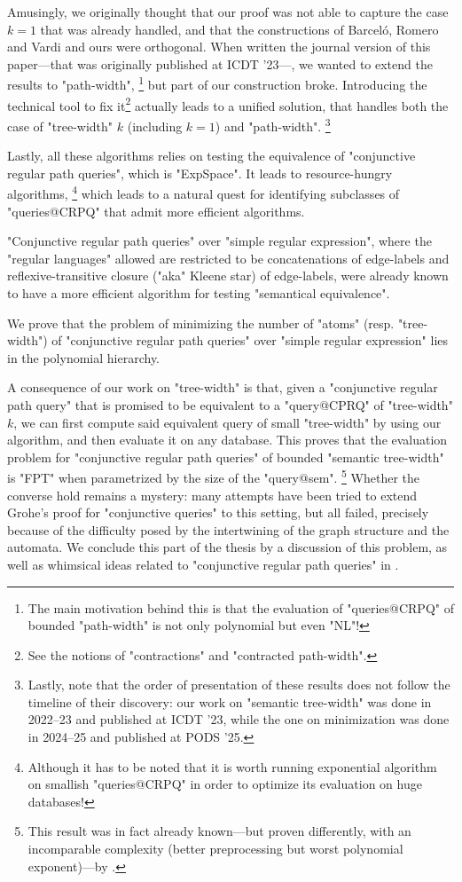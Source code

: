 Amusingly, we originally thought that our proof was not able to
capture the case $k=1$ that was already handled, and that the constructions
of Barceló, Romero and Vardi and ours were orthogonal.
When written the journal version of this paper---that was originally
published at ICDT '23---, we wanted to extend the results to "path-width",%
\footnote{The main motivation behind this is that the evaluation of "queries@CRPQ"
of bounded "path-width" is not only polynomial but even "NL"!}
but part of our construction broke. Introducing the technical tool
to fix it\footnote{See the notions of "contractions" and "contracted path-width".}
actually leads to a unified solution, that handles both
the case of "tree-width" $k$ (including $k=1$) and "path-width".%
\footnote{Lastly, note that the order of presentation of these results
does not follow the timeline of their discovery: our work on "semantic tree-width"
was done in 2022--23 and published at ICDT '23, while the one on minimization
was done in 2024--25 and published at PODS '25.}

Lastly, all these algorithms relies on testing the equivalence
of "conjunctive regular path queries", which is "ExpSpace".
It leads to resource-hungry algorithms,%
\footnote{Although it has to be noted that it is worth running exponential
algorithm on smallish "queries@CRPQ" in order to optimize
its evaluation on huge databases!}
which leads to a natural quest for identifying subclasses
of "queries@CRPQ" that admit more efficient algorithms.

"Conjunctive regular path queries" over "simple regular expression",
where the "regular languages" allowed are restricted to be concatenations of
edge-labels and reflexive-transitive closure ("aka" Kleene star) of
edge-labels, were already known to have a more efficient
algorithm for testing "semantical equivalence".

\begin{contribution}
	We prove that the problem of minimizing the number of "atoms" (resp. "tree-width")
	of "conjunctive regular path queries" over "simple regular expression"
	lies in the polynomial hierarchy.
\end{contribution}

A consequence of our work on "tree-width" is that,
given a "conjunctive regular path query" that is promised to be equivalent
to a "query@CPRQ" of "tree-width" $k$, we can first compute said
equivalent query of small "tree-width" by using our algorithm,
and then evaluate it on any database. This proves that the evaluation
problem for "conjunctive regular path queries" of bounded "semantic tree-width"
is "FPT" when parametrized by the size of the "query@sem".%
\footnote{This result was in fact already known---but proven differently, with
an incomparable complexity (better preprocessing but worst polynomial exponent)---by
.}
Whether the converse hold remains a mystery: many attempts
have been tried to extend Grohe's proof for "conjunctive queries" to this setting,
but all failed, precisely because of the difficulty posed
by the intertwining of the graph structure and the automata.
We conclude this part of the thesis by a discussion of this problem,
as well as whimsical ideas related to "conjunctive regular path queries"
in .